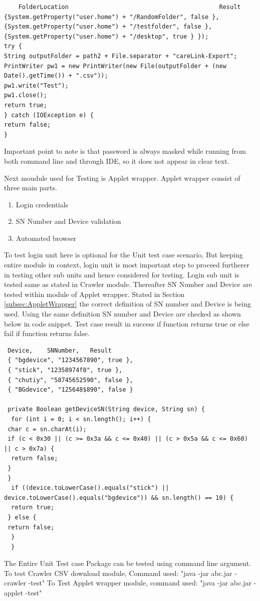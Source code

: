 \documentclass[article,type=msc,colorback,accentcolor=tud9c,twoside,11pt]{tudthesis}
\begin{document}
 \begin{lstlisting}
	FolderLocation											Result
{System.getProperty("user.home") + "/RandomFolder", false },
{System.getProperty("user.home") + "/testfolder", false },
{System.getProperty("user.home") + "/desktop", true } });
try {
String outputFolder = path2 + File.separator + "careLink-Export";
PrintWriter pw1 = new PrintWriter(new File(outputFolder + (new Date().getTime()) + ".csv"));
pw1.write("Test");
pw1.close();
return true;
} catch (IOException e) {
return false;
}
\end{lstlisting}
 Important point to note is that password is always masked while running from both command line and through IDE, so it does not appear in clear text.
 
Next moudule used for Testing is Applet wrapper. Applet wrapper consist of three main parts.
 \begin{enumerate}
\item Login credentials
\item SN Number and Device validation
\item Automated browser
\end{enumerate}
To test login unit here is optional for the Unit test case scenario, But keeping entire module in context, login unit is most important step to proceed furtherer in testing other sub units and hence considered for testing. Login sub unit is tested same as stated in Crawler module. Thereafter SN Number and Device are tested within module of Applet wrapper. Stated in Section \ref{subsec:AppletWrapper} the correct definition of SN number and Device is being used. Using the same definition SN number and Device are checked as shown below in code snippet. Test case result in success if function returns true or else fail if function returns false.

\begin{lstlisting}
 Device, 	SNNumber, 	Result
 { "bgdevice", "1234567890", true },
 { "stick", "12358974f0", true },
 { "chutiy", "58745652590", false },
 { "BGdevice", "125648$890", false }
 
 private Boolean getDeviceSN(String device, String sn) {
  for (int i = 0; i < sn.length(); i++) {
 char c = sn.charAt(i);
 if (c < 0x30 || (c >= 0x3a && c <= 0x40) || (c > 0x5a && c <= 0x60) || c > 0x7a) {
  return false;
 }
 }
  if ((device.toLowerCase().equals("stick") || device.toLowerCase().equals("bgdevice")) && sn.length() == 10) {
  return true;
 } else {
 return false;
  }
  }
\end{lstlisting}
The Entire Unit Test case Package can be tested using command line argument.
To test Crawler CSV download module, Command used:\newline
"java -jar abc.jar -crawler -test"\newline 
To Test Applet wrapper module, command used:\newline
"java -jar abc.jar - applet -test"
 
\end{document}
